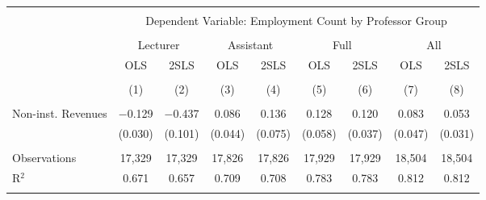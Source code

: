 
\begin{tabular}{@{\extracolsep{5pt}}lcccccccc} 
\\[-1.8ex]\hline 
\hline \\[-1.8ex] 
 & \multicolumn{8}{c}{Dependent Variable: Employment Count by Professor Group} \\ 
\cline{2-9} 
\\[-1.8ex] & \multicolumn{2}{c}{Lecturer} & \multicolumn{2}{c}{Assistant} & \multicolumn{2}{c}{Full} & \multicolumn{2}{c}{All} \\ 
 & OLS & 2SLS & OLS & 2SLS & OLS & 2SLS & OLS & 2SLS \\ 
\\[-1.8ex] & (1) & (2) & (3) & (4) & (5) & (6) & (7) & (8)\\ 
\hline \\[-1.8ex] 
 Non-inst. Revenues & $-$0.129 & $-$0.437 & 0.086 & 0.136 & 0.128 & 0.120 & 0.083 & 0.053 \\ 
  & (0.030) & (0.101) & (0.044) & (0.075) & (0.058) & (0.037) & (0.047) & (0.031) \\ 
 \hline \\[-1.8ex] 
Observations & 17,329 & 17,329 & 17,826 & 17,826 & 17,929 & 17,929 & 18,504 & 18,504 \\ 
R$^{2}$ & 0.671 & 0.657 & 0.709 & 0.708 & 0.783 & 0.783 & 0.812 & 0.812 \\ 
\hline 
\hline \\[-1.8ex] 
\end{tabular} 
